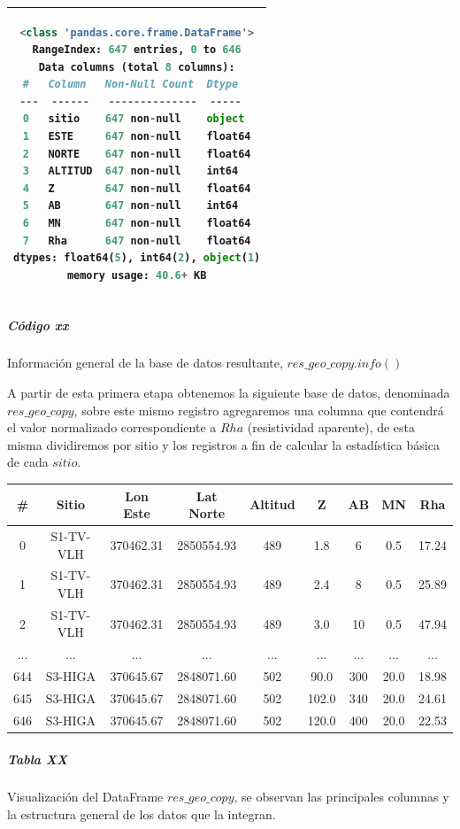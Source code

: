 \documentclass[sn-mathphys,Numbered]{sn-jnl}%
\theoremstyle{thmstyleone}%
\theoremstyle{thmstyletwo}%
\theoremstyle{thmstylethree}%
\begin{document}
\begin{center}
	\begin{tabular}{|c|}
			\hline
\begin{lstlisting}[language=python]
<class 'pandas.core.frame.DataFrame'>
RangeIndex: 647 entries, 0 to 646
Data columns (total 8 columns):
#   Column   Non-Null Count  Dtype  
---  ------   --------------  -----  
0   sitio    647 non-null    object 
1   ESTE     647 non-null    float64
2   NORTE    647 non-null    float64
3   ALTITUD  647 non-null    int64  
4   Z        647 non-null    float64
5   AB       647 non-null    int64  
6   MN       647 non-null    float64
7   Rha      647 non-null    float64
dtypes: float64(5), int64(2), object(1)
memory usage: 40.6+ KB
\end{lstlisting}\\

		\hline
\end{tabular}
\subparagraph*{Código xx}{\footnotesize Información general de la base de datos resultante, $res\_geo\_copy.info()$}

\end{center}

A partir de esta primera etapa obtenemos la siguiente base de datos, denominada $res\_geo\_copy$, sobre este mismo registro agregaremos una columna que contendrá el valor normalizado correspondiente a $Rha$ (resistividad aparente), de esta misma dividiremos por sitio y los registros a fin de calcular la estadística básica de cada $sitio$.

\begin{center}
	\begin{tabular}{|c|c|c|c|c|c|c|c|c|}
		\hline
		\#&Sitio & Lon Este & Lat Norte & Altitud & Z & AB & MN & Rha \\
		\hline
		0&S1-TV-VLH&	370462.31&	2850554.93&	489&	1.8&	6&	0.5&	17.24\\	
		1&S1-TV-VLH&	370462.31&	2850554.93&	489&	2.4&	8&	0.5&	25.89\\
		2&S1-TV-VLH&	370462.31&	2850554.93&	489&	3.0&	10&	0.5&	47.94 \\
		...& ... &...  &...  &...  &...  &...  &...  &...  \\
		644&	S3-HIGA&	370645.67&	2848071.60&	502&	90.0&	300&	20.0&	18.98  \\
		645&	S3-HIGA&	370645.67&	2848071.60&	502&	102.0&	340&	20.0&	24.61 \\
		646&	S3-HIGA&	370645.67&	2848071.60&	502&	120.0&	400&	20.0&	22.53 \\
		\hline
	\end{tabular}
	\subparagraph{Tabla XX}{\footnotesize  Visualización del DataFrame $res\_geo\_copy$, se observan las principales columnas y la estructura general de los datos que la integran.}\\
\end{center}
\end{document}
